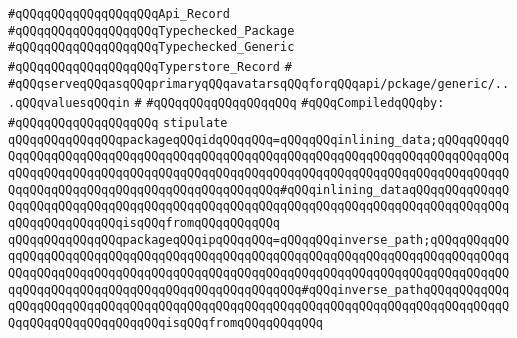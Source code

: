 \verb|#qQQqqQQqqQQqqQQqqQQqApi_Record|\newline
\verb|#qQQqqQQqqQQqqQQqqQQqTypechecked_Package|\newline
\verb|#qQQqqQQqqQQqqQQqqQQqTypechecked_Generic|\newline
\verb|#qQQqqQQqqQQqqQQqqQQqTyperstore_Record|\newline
\verb|#|\newline
\verb|#qQQqserveqQQqasqQQqprimaryqQQqavatarsqQQqforqQQqapi/pckage/generic/...qQQqvaluesqQQqin|\newline
\verb|#|\newline
\verb|#qQQqqQQqqQQqqQQqqQQq|\newline
\newline
\verb|#qQQqCompiledqQQqby:|\newline
\verb|#qQQqqQQqqQQqqQQqqQQq|\newline
\newline
\newline
\newline
\newline
\verb|stipulate|\newline
\verb|qQQqqQQqqQQqqQQqpackageqQQqidqQQqqQQq=qQQqqQQqinlining_data;qQQqqQQqqQQqqQQqqQQqqQQqqQQqqQQqqQQqqQQqqQQqqQQqqQQqqQQqqQQqqQQqqQQqqQQqqQQqqQQqqQQqqQQqqQQqqQQqqQQqqQQqqQQqqQQqqQQqqQQqqQQqqQQqqQQqqQQqqQQqqQQqqQQqqQQqqQQqqQQqqQQqqQQqqQQqqQQqqQQqqQQqqQQq#qQQqinlining_dataqQQqqQQqqQQqqQQqqQQqqQQqqQQqqQQqqQQqqQQqqQQqqQQqqQQqqQQqqQQqqQQqqQQqqQQqqQQqqQQqqQQqqQQqqQQqqQQqqQQqisqQQqfromqQQqqQQqqQQq|\newline
\verb|qQQqqQQqqQQqqQQqpackageqQQqipqQQqqQQq=qQQqqQQqinverse_path;qQQqqQQqqQQqqQQqqQQqqQQqqQQqqQQqqQQqqQQqqQQqqQQqqQQqqQQqqQQqqQQqqQQqqQQqqQQqqQQqqQQqqQQqqQQqqQQqqQQqqQQqqQQqqQQqqQQqqQQqqQQqqQQqqQQqqQQqqQQqqQQqqQQqqQQqqQQqqQQqqQQqqQQqqQQqqQQqqQQqqQQqqQQqqQQq#qQQqinverse_pathqQQqqQQqqQQqqQQqqQQqqQQqqQQqqQQqqQQqqQQqqQQqqQQqqQQqqQQqqQQqqQQqqQQqqQQqqQQqqQQqqQQqqQQqqQQqqQQqqQQqqQQqisqQQqfromqQQqqQQqqQQq|\newline
